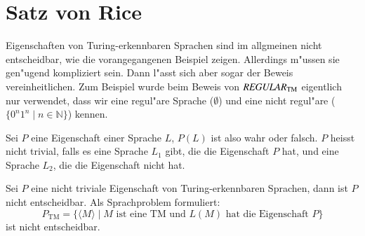\section{Satz von Rice}
Eigenschaften von Turing-erkennbaren Sprachen sind im allgmeinen
nicht entscheidbar, wie die vorangegangenen Beispiel zeigen.
Allerdings m"ussen sie gen"u\-gend kompliziert sein. Dann l"asst
sich aber sogar der Beweis vereinheitlichen. Zum Beispiel wurde
beim Beweis von $\text{\it REGULAR}_{\text{TM}}$ eigentlich
nur verwendet, dass wir eine regul"are Sprache ($\emptyset$) und
eine nicht regul"are ($\{0^n1^n\;|\;n\in\mathbb N\}$) kennen.

\begin{definition}
Sei $P$ eine Eigenschaft einer Sprache $L$, $P(L)$ ist also wahr oder
falsch. $P$ heisst nicht trivial, falls es eine Sprache $L_1$ gibt,
die die Eigenschaft $P$ hat, und eine Sprache $L_2$, die die
Eigenschaft nicht hat.
\end{definition}

\begin{satz}[Rice]
\label{rice-theorem}
Sei $P$ eine nicht triviale Eigenschaft von Turing-erkennbaren Sprachen,
dann ist $P$ nicht entscheidbar. Als Sprachproblem formuliert:
\[
P_{\text{TM}}=\{ \langle M\rangle\;|\;
\text{$M$ ist eine TM und $L(M)$ hat die Eigenschaft $P$}
\}
\]
ist nicht entscheidbar.
\end{satz}

